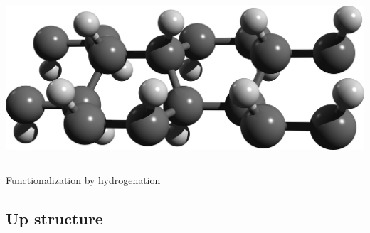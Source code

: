 \documentclass{beamer}
\begin{document}
\begin{frame}
\begin{columns}
\begin{center}
\vspace{7mm}
\includegraphics[width=1.0\textwidth]{figs/boat1.png}\\

\vspace{3mm}
\end{center}

\end{columns}

\begin{center}

{\huge Functionalization by hydrogenation}
\end{center}
\end{frame}





\subsection{Up structure}
\end{document}

